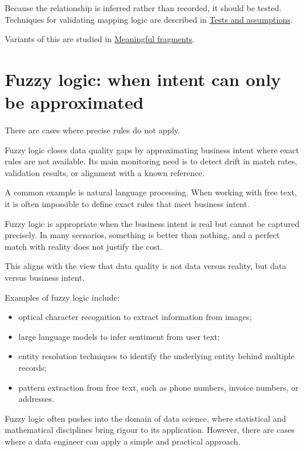 \documentclass[10pt,openany,10pt]{book}
\providecommand{\tightlist}{%
  \setlength{\itemsep}{0pt}\setlength{\parskip}{0pt}}
\begin{document}
Because the relationship is inferred rather than recorded, it should be
tested. Techniques for validating mapping logic are described in
\hyperref[docs-quality-reliability-tests-and-assumptions]{Tests and
assumptions}.

Variants of this are studied in
\hyperref[docs-creating-information-meaningful-fragments]{Meaningful
fragments}.

\section{Fuzzy logic: when intent can only be
approximated}\label{fuzzy-logic-when-intent-can-only-be-approximated}

There are cases where precise rules do not apply.

Fuzzy logic closes data quality gaps by approximating business intent
where exact rules are not available. Its main monitoring need is to
detect drift in match rates, validation results, or alignment with a
known reference.

A common example is natural language processing. When working with free
text, it is often impossible to define exact rules that meet business
intent.

Fuzzy logic is appropriate when the business intent is real but cannot
be captured precisely. In many scenarios, something is better than
nothing, and a perfect match with reality does not justify the cost.

This aligns with the view that data quality is not data versus reality,
but data versus business intent.

Examples of fuzzy logic include:

\begin{itemize}
\tightlist
\item
  optical character recognition to extract information from images;
\item
  large language models to infer sentiment from user text;
\item
  entity resolution techniques to identify the underlying entity behind
  multiple records;
\item
  pattern extraction from free text, such as phone numbers, invoice
  numbers, or addresses.
\end{itemize}

Fuzzy logic often pushes into the domain of data science, where
statistical and mathematical disciplines bring rigour to its
application. However, there are cases where a data engineer can apply a
simple and practical approach.
\end{document}
